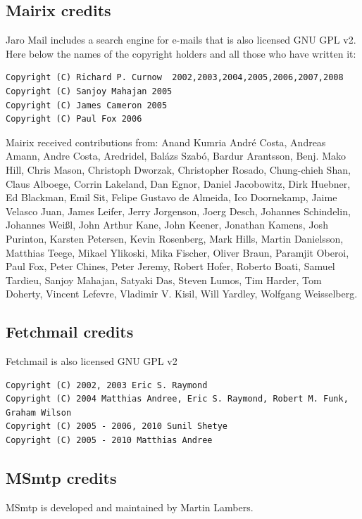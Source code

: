 \documentclass[a4,onecolumn,portrait]{article}
\begin{document}
\subsection{Mairix credits}
\label{sec-11-4}
Jaro Mail includes a search engine for e-mails that is also licensed
GNU GPL v2. Here below the names of the copyright holders and all
those who have written it:

\begin{verbatim}
Copyright (C) Richard P. Curnow  2002,2003,2004,2005,2006,2007,2008
Copyright (C) Sanjoy Mahajan 2005
Copyright (C) James Cameron 2005
Copyright (C) Paul Fox 2006
\end{verbatim}

Mairix received contributions from: Anand Kumria André Costa, Andreas
Amann, Andre Costa, Aredridel, Balázs Szabó, Bardur Arantsson,
Benj. Mako Hill, Chris Mason, Christoph Dworzak, Christopher Rosado,
Chung-chieh Shan, Claus Alboege, Corrin Lakeland, Dan Egnor, Daniel
Jacobowitz, Dirk Huebner, Ed Blackman, Emil Sit, Felipe Gustavo de
Almeida, Ico Doornekamp, Jaime Velasco Juan, James Leifer, Jerry
Jorgenson, Joerg Desch, Johannes Schindelin, Johannes Weißl, John
Arthur Kane, John Keener, Jonathan Kamens, Josh Purinton, Karsten
Petersen, Kevin Rosenberg, Mark Hills, Martin Danielsson, Matthias
Teege, Mikael Ylikoski, Mika Fischer, Oliver Braun, Paramjit Oberoi,
Paul Fox, Peter Chines, Peter Jeremy, Robert Hofer, Roberto Boati,
Samuel Tardieu, Sanjoy Mahajan, Satyaki Das, Steven Lumos, Tim Harder,
Tom Doherty, Vincent Lefevre, Vladimir V. Kisil, Will Yardley,
Wolfgang Weisselberg.
\subsection{Fetchmail credits}
\label{sec-11-5}

Fetchmail is also licensed GNU GPL v2

\begin{verbatim}
Copyright (C) 2002, 2003 Eric S. Raymond
Copyright (C) 2004 Matthias Andree, Eric S. Raymond, Robert M. Funk, Graham Wilson
Copyright (C) 2005 - 2006, 2010 Sunil Shetye
Copyright (C) 2005 - 2010 Matthias Andree
\end{verbatim}
\subsection{MSmtp credits}
\label{sec-11-6}

MSmtp is developed and maintained by Martin Lambers.
\end{document}
